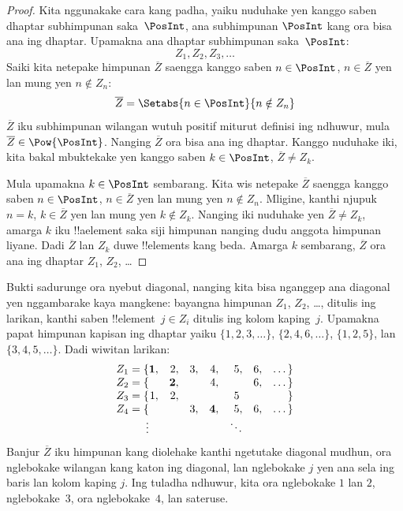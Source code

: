\documentclass[../../../include/open-logic-section]{subfiles}
\begin{document}
\begin{proof}
Kita nggunakake cara kang padha, yaiku nuduhake yen kanggo saben dhaptar
subhimpunan saka~$\PosInt$, ana subhimpunan $\PosInt$ kang ora bisa ana
ing dhaptar. Upamakna ana dhaptar subhimpunan saka~$\PosInt$:
\[
Z_{1}, Z_{2}, Z_{3}, \dots
\]
Saiki kita netepake himpunan $\overline{Z}$ saengga kanggo saben $n \in \PosInt$,
$n \in \overline{Z}$ yen lan mung yen $n \notin Z_{n}$:
\[
\overline{Z} = \Setabs{n \in \PosInt}{n \notin Z_n}
\]
$\overline{Z}$ iku subhimpunan wilangan wutuh positif miturut definisi ing ndhuwur, mula $\overline{Z} \in
\Pow{\PosInt}$. Nanging $\overline{Z}$ ora bisa ana ing dhaptar.
Kanggo nuduhake iki, kita bakal mbuktekake yen kanggo saben $k \in \PosInt$,
$\overline{Z} \neq Z_k$.

Mula upamakna $k \in \PosInt$ sembarang. Kita wis netepake $\overline{Z}$
saengga kanggo saben $n \in \PosInt$, $n \in \overline{Z}$ yen lan mung yen
$n \notin Z_n$. Mligine, kanthi njupuk $n=k$, $k \in \overline{Z}$
yen lan mung yen $k \notin Z_k$. Nanging iki nuduhake
yen $\overline{Z} \neq Z_k$, amarga $k$ iku !!a{element} saka siji
himpunan nanging dudu anggota himpunan liyane. Dadi $\overline{Z}$ lan $Z_k$
duwe !!{element}s kang beda. Amarga $k$ sembarang, $\overline{Z}$
ora ana ing dhaptar $Z_1$, $Z_2$, \dots
\end{proof}

\begin{explain}
Bukti sadurunge ora nyebut diagonal, nanging kita bisa nganggep
ana diagonal yen nggambarake kaya mangkene: bayangna himpunan
$Z_1$, $Z_2$, \dots, ditulis ing larikan, kanthi saben
!!{element}~$j \in Z_i$ ditulis ing kolom kaping~$j$. Upamakna
papat himpunan kapisan ing dhaptar yaiku $\{1,2,3,\dots\}$, $\{2, 4, 6, \dots\}$,
$\{1,2,5\}$, lan $\{3,4,5,\dots\}$. Dadi wiwitan larikan:
\[
\begin{array}{r@{}rrrrrrr}
  Z_1 = \{ & \mathbf{1}, & 2, & 3, & 4, & 5, & 6, & \dots\}\\
  Z_2 = \{ &  & \mathbf{2}, &  & 4, &  & 6, & \dots\}\\
  Z_3 = \{ & 1, & 2, &  &  & 5\phantom{,} &  & \}\\
  Z_4 = \{ &  &  & 3, & \mathbf{4}, & 5, & 6, & \dots\}\\
  \vdots & & & & & \ddots
\end{array}
\]
Banjur $\overline{Z}$ iku himpunan kang diolehake kanthi ngetutake diagonal
mudhun, ora nglebokake wilangan kang katon ing diagonal, lan nglebokake
$j$ yen ana sela ing baris lan kolom kaping $j$.
Ing tuladha ndhuwur, kita ora nglebokake $1$ lan $2$, nglebokake~$3$,
ora nglebokake~$4$, lan sateruse.
\end{explain}
\end{document}
